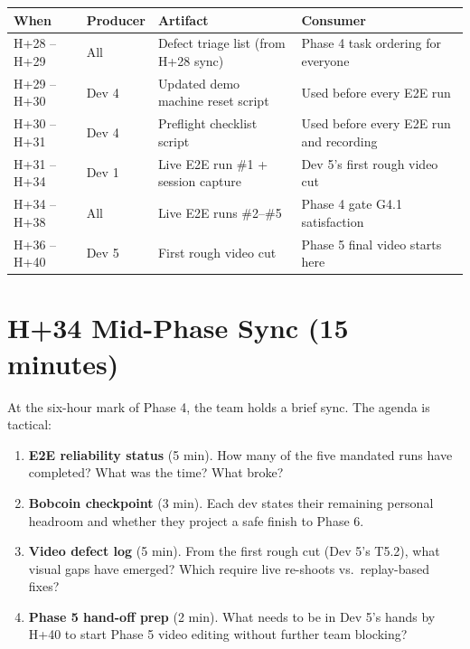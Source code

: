 \documentclass[11pt,letterpaper]{article}
\begin{document}
\begin{longtable}{|p{1.4cm}|p{2.6cm}|p{4cm}|p{6cm}|}
\hline
\rowcolor{ibmblue!10}
\textbf{When} & \textbf{Producer} & \textbf{Artifact} & \textbf{Consumer} \\
\hline
H+28 -- H+29 & All & Defect triage list (from H+28 sync) & Phase 4 task ordering for everyone \\
\hline
H+29 -- H+30 & Dev 4 & Updated demo machine reset script & Used before every E2E run \\
\hline
H+30 -- H+31 & Dev 4 & Preflight checklist script & Used before every E2E run and recording \\
\hline
H+31 -- H+34 & Dev 1 & Live E2E run \#1 + session capture & Dev 5's first rough video cut \\
\hline
H+34 -- H+38 & All & Live E2E runs \#2--\#5 & Phase 4 gate G4.1 satisfaction \\
\hline
H+36 -- H+40 & Dev 5 & First rough video cut & Phase 5 final video starts here \\
\hline
\end{longtable}

\section{H+34 Mid-Phase Sync (15 minutes)}

At the six-hour mark of Phase 4, the team holds a brief sync. The agenda is tactical:

\begin{enumerate}
  \item \textbf{E2E reliability status} (5 min). How many of the five mandated runs have completed? What was the time? What broke?
  \item \textbf{Bobcoin checkpoint} (3 min). Each dev states their remaining personal headroom and whether they project a safe finish to Phase 6.
  \item \textbf{Video defect log} (5 min). From the first rough cut (Dev 5's T5.2), what visual gaps have emerged? Which require live re-shoots vs.~replay-based fixes?
  \item \textbf{Phase 5 hand-off prep} (2 min). What needs to be in Dev 5's hands by H+40 to start Phase 5 video editing without further team blocking?
\end{enumerate}

\end{document}

